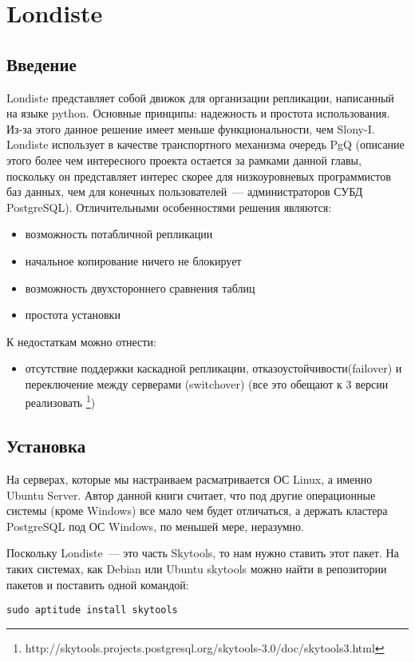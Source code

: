 \section{Londiste}
\subsection{Введение}
Londiste представляет собой движок для организации репликации, написанный на языке python. 
Основные принципы: надежность и простота использования. Из-за этого данное решение имеет меньше функциональности, 
чем Slony-I. Londiste использует в качестве транспортного механизма очередь PgQ  (описание этого более чем интересного 
проекта остается за рамками данной главы, поскольку он представляет интерес скорее для низкоуровневых программистов 
баз данных, чем для конечных пользователей~--- администраторов СУБД PostgreSQL). Отличительными особенностями решения являются:
\begin{itemize}
\item возможность потабличной репликации
\item начальное копирование ничего не блокирует
\item возможность двухстороннего сравнения таблиц
\item простота установки
\end{itemize}

К недостаткам можно отнести:
\begin{itemize}
\item отсутствие поддержки каскадной репликации, отказоустойчивости(failover) и переключение между 
серверами (switchover) (все это обещают к 3 версии реализовать
\footnote{http://skytools.projects.postgresql.org/skytools-3.0/doc/skytools3.html})
\end{itemize}


\subsection{Установка}
На серверах, которые мы настраиваем расматривается ОС Linux, а именно Ubuntu Server. 
Автор данной книги считает, что под другие операционные системы (кроме Windows) все мало чем будет отличаться, 
а держать кластера PostgreSQL под ОС Windows, по меньшей мере, неразумно.

Поскольку Londiste~--- это часть Skytools, то нам нужно ставить этот пакет. На таких системах, как Debian или Ubuntu skytools 
можно найти в репозитории пакетов и поставить одной командой:
\begin{lstlisting}[label=lst:londiste1,caption=Установка]
sudo aptitude install skytools
\end{lstlisting}

